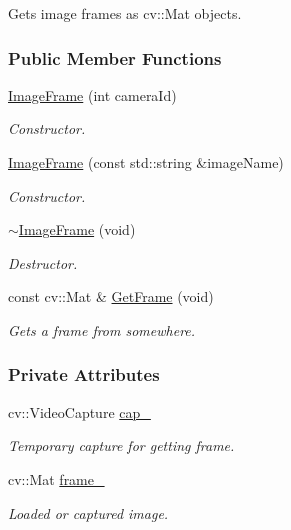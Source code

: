 Gets image frames as cv\-::\-Mat objects. \subsubsection*{Public Member Functions}
\begin{DoxyCompactItemize}
\item 
\hyperlink{group___core_a117419148b5bcc26cc145d3f2f186bad}{Image\-Frame} (int camera\-Id)
\begin{DoxyCompactList}\small\item\em Constructor. \end{DoxyCompactList}\item 
\hyperlink{group___core_a59c1d9b9e30400514172b549b5f087d9}{Image\-Frame} (const std\-::string \&image\-Name)
\begin{DoxyCompactList}\small\item\em Constructor. \end{DoxyCompactList}\item 
\hyperlink{group___core_a2f365f54366e61d0fffe41a2e24ba570}{$\sim$\-Image\-Frame} (void)
\begin{DoxyCompactList}\small\item\em Destructor. \end{DoxyCompactList}\item 
const cv\-::\-Mat \& \hyperlink{group___core_a886d65831c708b65ba5596aab1aca438}{Get\-Frame} (void)
\begin{DoxyCompactList}\small\item\em Gets a frame from somewhere. \end{DoxyCompactList}\end{DoxyCompactItemize}
\subsubsection*{Private Attributes}
\begin{DoxyCompactItemize}
\item 
cv\-::\-Video\-Capture \hyperlink{group___core_a1f8ba0c6c7f724a41f5f5fef19bfe035}{cap\-\_\-}
\begin{DoxyCompactList}\small\item\em Temporary capture for getting frame. \end{DoxyCompactList}\item 
cv\-::\-Mat \hyperlink{group___core_a6aaede1e96c67711280696df991b4508}{frame\-\_\-}
\begin{DoxyCompactList}\small\item\em Loaded or captured image. \end{DoxyCompactList}\end{DoxyCompactItemize}


